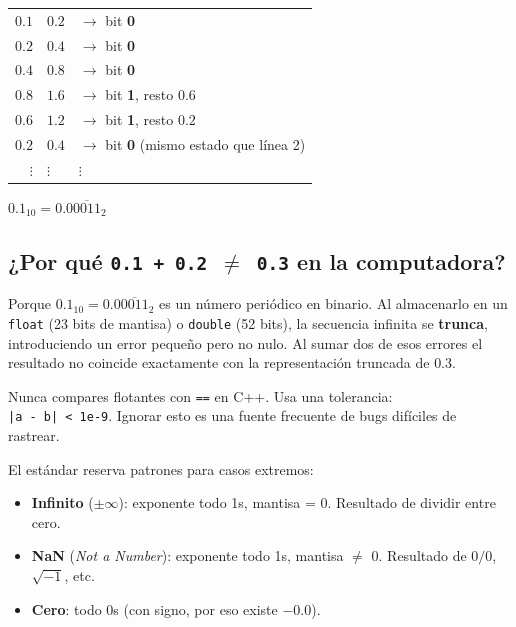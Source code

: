 \documentclass[12pt, oneside]{article}
\begin{document}
\begin{ejemplo}
\begin{center}
\begin{tabular}{r@{\ $\times 2=$\ }ll}
  $0.1$ & $0.2$ & $\to$ bit \textbf{0} \\
  $0.2$ & $0.4$ & $\to$ bit \textbf{0} \\
  $0.4$ & $0.8$ & $\to$ bit \textbf{0} \\
  $0.8$ & $1.6$ & $\to$ bit \textbf{1}, resto $0.6$ \\
  $0.6$ & $1.2$ & $\to$ bit \textbf{1}, resto $0.2$ \\
  $0.2$ & $0.4$ & $\to$ bit \textbf{0} \quad (mismo estado que línea 2) \\
  $\vdots$ & $\vdots$ & $\vdots$ \\
\end{tabular}
\end{center}
$0.1_{10} = 0.0\overline{0011}_2$
\end{ejemplo}

\subsection{¿Por qué \texttt{0.1 + 0.2 $\neq$ 0.3} en la computadora?}

Porque $0.1_{10} = 0.0\overline{0011}_2$ es un número periódico en
binario. Al almacenarlo en un \texttt{float} (23 bits de mantisa) o
\texttt{double} (52 bits), la secuencia infinita se \textbf{trunca},
introduciendo un error pequeño pero no nulo.
Al sumar dos de esos errores el resultado no coincide exactamente con
la representación truncada de $0.3$.

\begin{advertencia}
  Nunca compares flotantes con \texttt{==} en C++. Usa una tolerancia:\\
  \texttt{|a - b| < 1e-9}. Ignorar esto es una fuente frecuente de
  bugs difíciles de rastrear.
\end{advertencia}

\begin{tecnico}
  El estándar reserva patrones para casos extremos:
  \begin{itemize}
    \item \textbf{Infinito} ($\pm\infty$): exponente todo 1s, mantisa = 0.
          Resultado de dividir entre cero.
    \item \textbf{NaN} (\textit{Not a Number}): exponente todo 1s,
          mantisa $\neq$ 0. Resultado de $0/0$, $\sqrt{-1}$, etc.
    \item \textbf{Cero}: todo 0s (con signo, por eso existe $-0.0$).
  \end{itemize}
\end{tecnico}
\end{document}

